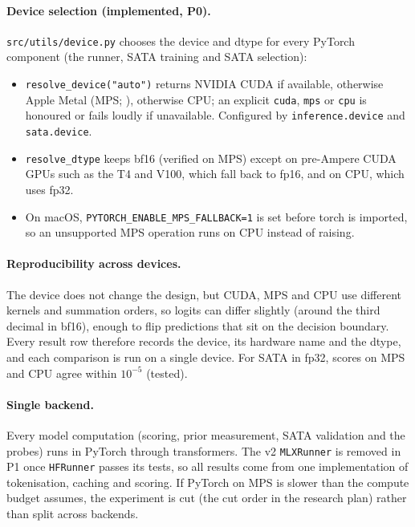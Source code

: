 \documentclass[11pt,a4paper]{article}
\newcommand{\1}{\mathbf{1}}
\theoremstyle{plain}
\theoremstyle{definition}
\theoremstyle{remark}
\begin{document}
\paragraph{Device selection (implemented, P0).} \texttt{src/utils/device.py}
chooses the device and dtype for every PyTorch component (the runner, SATA
training and SATA selection):
\begin{itemize}[nosep]
  \item \texttt{resolve\_device("auto")} returns NVIDIA CUDA if available,
        otherwise Apple Metal (MPS; \citealp{apple2024mps}), otherwise CPU;
        an explicit
        \texttt{cuda}, \texttt{mps} or \texttt{cpu} is honoured or fails
        loudly if unavailable. Configured by \texttt{inference.device} and
        \texttt{sata.device}.
  \item \texttt{resolve\_dtype} keeps bf16 \citep{kalamkar2019study}
        (verified on MPS) except on
        pre-Ampere CUDA GPUs such as the T4 and V100, which fall back to
        fp16, and on CPU, which uses fp32.
  \item On macOS, \texttt{PYTORCH\_ENABLE\_MPS\_FALLBACK=1} is set before
        torch is imported, so an unsupported MPS operation runs on CPU
        instead of raising.
\end{itemize}

\paragraph{Reproducibility across devices.} The device does not change the
design, but CUDA, MPS and CPU use different kernels and summation orders, so
logits can differ slightly (around the third decimal in bf16), enough to flip
predictions that sit on the decision boundary. Every result row therefore
records the device, its hardware name and the dtype, and each comparison is
run on a single device. For SATA in fp32, scores on MPS and CPU agree within
$10^{-5}$ (tested).

\paragraph{Single backend.} Every model computation (scoring, prior
measurement, SATA validation and the probes) runs in PyTorch through
transformers. The v2 \texttt{MLXRunner} is removed in P1 once
\texttt{HFRunner} passes its tests, so all results come from one
implementation of tokenisation, caching and scoring. If PyTorch on MPS is
slower than the compute budget assumes, the experiment is cut (the cut order
in the research plan) rather than split across backends.
\end{document}
